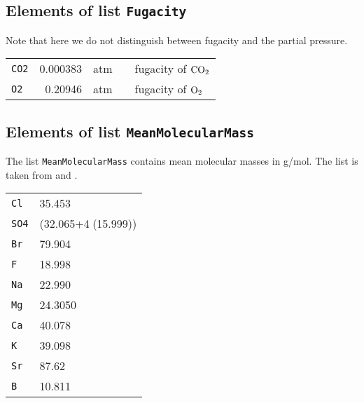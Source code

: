 \documentclass[a4paper]{article}
\begin{document}
\subsection{Elements of list \texttt{Fugacity}}
Note that here we do not distinguish between fugacity and the partial pressure.\\


\begin{tabular}{|lrllp{6cm}|}  \hline 
\texttt{CO2} & 0.000383 & atm & \citep{Borges2004a}  & fugacity of $\rm CO_2$\\
\texttt{O2}  & 0.20946  & atm & \citep{Williams2004} & fugacity of $\rm O_2$ \\ \hline
\end{tabular}


  
\subsection{Elements of list \texttt{MeanMolecularMass}}
The list  \texttt{MeanMolecularMass} contains mean molecular masses in g/mol. The list is taken from \citet[chap. 5, p. 3]{DOE1994} and \citet[chap. 5, p. 4]{Dickson2007}.\\
\begin{center}
\begin{tabular}{|ll|} \hline
\texttt{Cl}  & 35.453\\
\texttt{SO4} & (32.065+4$\;$(15.999))\\
\texttt{Br}  & 79.904\\
\texttt{F}   & 18.998\\
\texttt{Na}  & 22.990\\
\texttt{Mg}  & 24.3050\\
\texttt{Ca}  & 40.078\\
\texttt{K}   & 39.098\\
\texttt{Sr}  & 87.62\\
\texttt{B}   & 10.811\\ \hline
\end{tabular}
\end{center}
\end{document}
